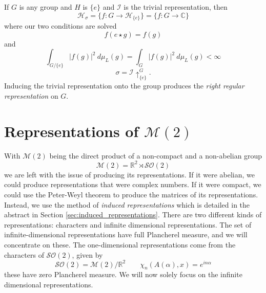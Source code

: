 \documentclass{article}
\begin{document}
\begin{example}
    If $G$ is any group and $H$ is $\{ e \}$ and $\mathcal{I}$ is the trivial representation, then
    \[ 
        \mathcal{H}_{\sigma} = \{ f: G \rightarrow \mathcal{H}_{\{ e \}} \} = \{ f: G \rightarrow \mathbb{C} \} 
    \] 
    where our two conditions are solved
    \[ 
        f(e \star g ) = f(g) 
    \]
    and
    \[ 
        \int_{G/\{ e \}} | f(g) |^{2} \ d\mu_{L}(g) = \int_{G} | f(g) |^{2} \ d\mu_{L}(g) < \infty 
    \]
    \[ \sigma = \mathcal{I}\uparrow^{G}_{\{ e \}} .\]
    Inducing the trivial representation onto the group produces the \textit{right regular representation} on $G$.
\end{example}

\section{Representations of $\mathcal{M}(2)$} 
With $\mathcal{M}(2)$ being the direct product of a non-compact and a non-abelian group
\[ \mathcal{M}(2) = \mathbb{R}^{2} \rtimes \mathcal{SO}(2) \] 
we are left with the issue of producing its representations. If it were abelian, we could produce representations that were complex numbers. If it were compact, we could use the Peter-Weyl theorem to produce the matrices of its representations. Instead, we use the method of \textit{induced representations} which is detailed in the abstract in Section \ref{sec:induced_representations}.
There are two different kinds of representations: characters and infinite dimensional representations. The set of infinite-dimensional representations have full Plancherel measure, and we will concentrate on these. The one-dimensional representations come from the characters of $\mathcal{SO}(2)$, given by
\[%
    \mathcal{SO}(2) = \mathcal{M}(2)/\mathbb{R}^{2}
    \qquad
    \chi_{n}(A(\alpha),x) = e^{in\alpha} 
\]%
these have zero Plancherel measure. We will now solely focus on the infinite dimensional representations. 
\end{document}
